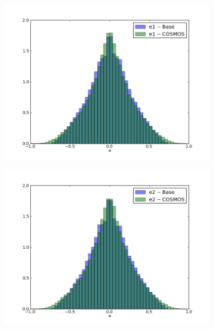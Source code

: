 \documentclass[]{article}
\begin{document}
\begin{figure}[H]
\centering
\begin{subfigure}[b]{0.3\textwidth}
               \centering
              \includegraphics[width=\textwidth]{validation_figures/e1_hist.png}
               \label{fig:ellip1}
        \end{subfigure}
        \begin{subfigure}[b]{0.3\textwidth}
               \centering
               \includegraphics[width=\textwidth]{validation_figures/e2_hist.png}
               \label{fig:ellip2}
      \end{subfigure}


\end{figure}
\end{document}
